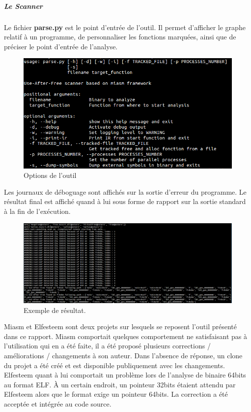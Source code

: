 \subparagraph{Le Scanner}
Le fichier \textbf{parse.py} est le point d'entrée de l'outil. Il permet d'afficher le graphe relatif à un programme, de personnaliser les fonctions marquées, ainsi que de préciser
le point d'entrée de l'analyse.
\begin{figure}[h]
    \centering
    \includegraphics[scale=0.7]{images/options-parse.png}\newline
    \caption{Options de l'outil}
\end{figure}
Les journaux de déboguage sont affichés sur la sortie d'erreur du programme. Le résultat final est affiché quand à lui sous forme de rapport sur la sortie standard à la fin de l'exécution.
\begin{figure}[h]
    \centering
    \includegraphics[scale=0.6]{images/results.png}\newline
    \caption{Exemple de résultat.}
\end{figure}
Miasm et Elfesteem sont deux projets sur lesquels se reposent l'outil présenté dans ce rapport. Miasm comportait quelques comportement ne satisfaisant pas à l'utilisation qui en a été faite,
il a été proposé plusieurs corrections / améliorations / changements à son auteur. Dans l'absence de réponse, un clone du projet a été créé et est disponible publiquement avec les changements.
Elfesteem quant à lui comportait un problème lors de l'analyse de binaire 64bits au format ELF. À un certain endroit, un pointeur 32bits étaient attendu par Elfesteem alors que le format
exige un pointeur 64bits. La correction a été acceptée et intégrée au code source.

